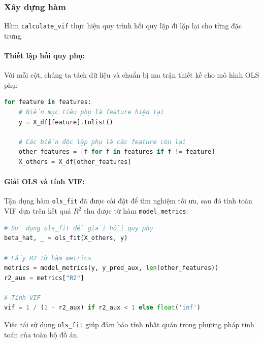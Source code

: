 \subsubsection{Xây dựng hàm}
Hàm \texttt{calculate\_vif} thực hiện quy trình hồi quy lặp đi lặp lại cho từng đặc trưng.

\paragraph{Thiết lập hồi quy phụ:}
Với mỗi cột, chúng ta tách dữ liệu và chuẩn bị ma trận thiết kế cho mô hình OLS phụ:
\begin{lstlisting}[language=Python, caption=Chuẩn bị dữ liệu cho hồi quy phụ]
for feature in features:
    # Biến mục tiêu phụ là feature hiện tại
    y = X_df[feature].tolist()
    
    # Các biến độc lập phụ là các feature còn lại
    other_features = [f for f in features if f != feature]
    X_others = X_df[other_features]
\end{lstlisting}

\paragraph{Giải OLS và tính VIF:}
Tận dụng hàm \texttt{ols\_fit} đã được cài đặt để tìm nghiệm tối ưu, sau đó tính toán VIF dựa trên kết quả $R^2$ thu được từ hàm \texttt{model\_metrics}:
\begin{lstlisting}[language=Python, caption=Tính toán VIF từ nghiệm đóng]
# Sử dụng ols_fit để giải hồi quy phụ
beta_hat, _ = ols_fit(X_others, y)

# Lấy R2 từ hàm metrics
metrics = model_metrics(y, y_pred_aux, len(other_features))
r2_aux = metrics["R2"]

# Tính VIF
vif = 1 / (1 - r2_aux) if r2_aux < 1 else float('inf')
\end{lstlisting}
Việc tái sử dụng \texttt{ols\_fit} giúp đảm bảo tính nhất quán trong phương pháp tính toán của toàn bộ đồ án.

